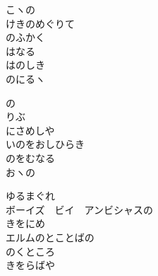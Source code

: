 \documentclass[10pt,b5j]{tarticle} %
\begin{document}
\begin{enumerate}
\begin{minipage}[c]{\blocksize}
        \vspace{\linespace}
        \item
        こヽの\\
        けきのめぐりて\\
        のふかく\\
        はなる\\
        はのしき\\
        のにるヽ
        
        \vspace{\linespace}
        \item
        の\\
        りぶ\\
        にさめしや\\
        いのをおしひらき\\
        のをむなる\\
        おヽの
        
        \vspace{\linespace}
        \item
        ゆるまぐれ\\
        ボーイズ　ビイ　アンビシャスの\\
        きをにめ\\
        エルムのとことばの\\
        のくところ\\
        きをらばや
    
    \end{minipage}
\end{enumerate} %
\end{document}
